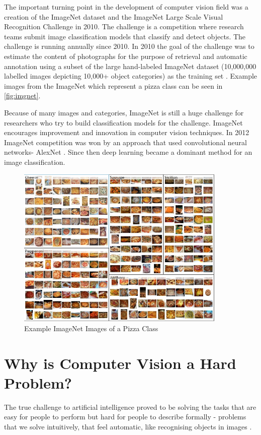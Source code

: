 The important turning point in the development of computer vision field was a creation of the ImageNet dataset and the ImageNet Large Scale Visual Recognition Challenge in 2010. The challenge is a competition where research teams submit image classification models that classify and detect objects. The challenge is running annually since 2010. In 2010 the goal of the challenge was to estimate the content of photographs for the purpose of retrieval and automatic annotation using a subset of the large hand-labeled ImageNet dataset (10,000,000 labelled images depicting 10,000+ object categories) as the training set \citep{ImageNet}. Example images from the ImageNet which represent a pizza class can be seen in \autoref{fig:imgnet}.


Because of many images and categories, ImageNet is still a huge challenge for researchers who try to build classification models for the challenge.  ImageNet encourages improvement and innovation in computer vision techniques. In 2012 ImageNet competition was won by an approach that used convolutional neural networks- AlexNet \citep{alex}. Since then deep learning became a dominant method for an image classification. 


 \begin{figure}[h]
\centering
\includegraphics[width=10cm]{Figures/2/imgnet.PNG}
\caption{Example ImageNet Images of a Pizza Class }
\label{fig:imgnet}
\end{figure}


\section{Why is Computer Vision a Hard Problem?}
The true challenge to artificial intelligence proved to be solving the tasks that are easy for people to perform but hard for people to describe formally - problems that we solve intuitively, that feel automatic, like recognising objects in images \citep{Goodfellow-et-al-2017}.


